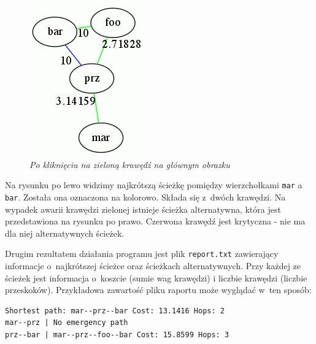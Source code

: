 \documentclass[a4paper, 12pt]{article}
\begin{document}
\begin{figure}[ht]
\begin{minipage}[b]{0.45\linewidth}
\includegraphics[width=\textwidth]{picture2.png}
\caption{\em Po kliknięciu na zieloną krawędź na głównym obrazku}
\label{fig:picture2}
\end{minipage}
\end{figure}

Na rysunku po lewo widzimy najkrótszą ścieżkę pomiędzy wierzchołkami \texttt{mar} a \texttt{bar}. Została ona oznaczona na kolorowo. Składa się z~dwóch krawędzi. Na wypadek awarii krawędzi zielonej istnieje ścieżka alternatywna, która jest przedstawiona na rysunku po prawo. Czerwona krawędź jest krytyczna - nie ma dla niej alternatywnych ścieżek.

Drugim rezultatem działania programu jest plik \texttt{report.txt} zawierający informacje o~najkrótszej ścieżce oraz ścieżkach alternatywnych. Przy każdej ze ścieżek jest informacja o~koszcie (sumie wag krawędzi) i liczbie krawędzi (liczbie przeskoków). Przykładowa zawartość pliku raportu może wyglądać w~ten sposób:

\begin{verbatim}
Shortest path: mar--prz--bar Cost: 13.1416 Hops: 2
mar--prz | No emergency path
prz--bar | mar--prz--foo--bar Cost: 15.8599 Hops: 3
\end{verbatim}
\end{document}
